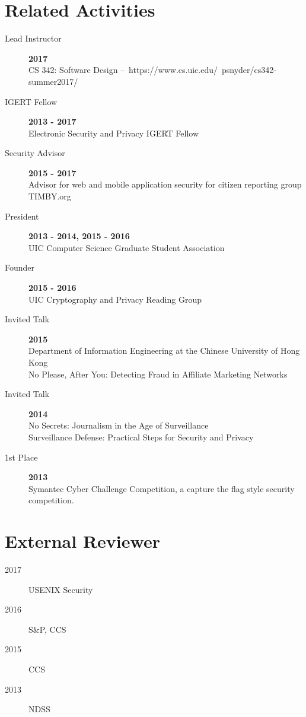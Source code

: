 \documentclass{vitae}
\begin{document}
  \section{Related Activities}
  \begin{description}

    \item[Lead Instructor] \hfill \textbf{2017}\\
    CS 342: Software Design – https://www.cs.uic.edu/~psnyder/cs342-summer2017/

    \item[IGERT Fellow] \hfill \textbf{2013 - 2017}\\
    Electronic Security and Privacy IGERT Fellow

    \item[Security Advisor] \hfill \textbf{2015 - 2017}\\
    Advisor for web and mobile application security for citizen reporting group TIMBY.org

    \item[President] \hfill \textbf{2013 - 2014, 2015 - 2016}\\
    UIC Computer Science Graduate Student Association

    \item[Founder] \hfill \textbf{2015 - 2016}\\
    UIC Cryptography and Privacy Reading Group

    \item[Invited Talk] \hfill \textbf{2015}\\
    Department of Information Engineering at the Chinese University of Hong Kong\\
    No Please, After You: Detecting Fraud in Affiliate Marketing Networks

    \item[Invited Talk] \hfill \textbf{2014}\\
    No Secrets: Journalism in the Age of Surveillance\\
    Surveillance Defense: Practical Steps for Security and Privacy

    \item[1st Place] \hfill \textbf{2013}\\
    Symantec Cyber Challenge Competition, a capture the flag style security competition.
  \end{description}

  \section{External Reviewer}
  \begin{description}
    \item [2017] USENIX Security
    \item [2016] S\&P, CCS
    \item [2015] CCS
    \item [2013] NDSS
  \end{description}
\end{document}
